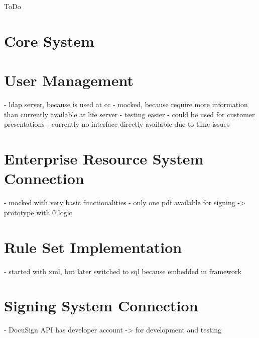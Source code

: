 ToDo

\section{Core System}

\section{User Management}
- ldap server, because is used at cc
- mocked, because require more information than currently available at life server
- testing easier
- could be used for customer presentations
- currently no interface directly available due to time issues

\section{Enterprise Resource System Connection}
- mocked with very basic functionalities
- only one pdf available for signing -> prototype with 0 logic

\section{Rule Set Implementation}
- started with xml, but later switched to sql because embedded in framework

\section{Signing System Connection}
- DocuSign API has developer account -> for development and testing 